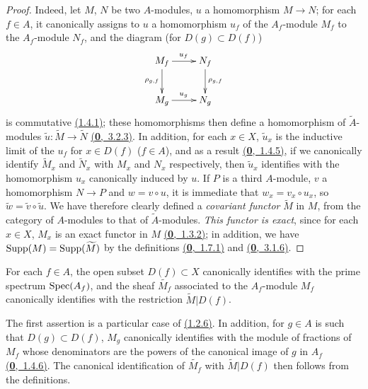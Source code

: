 \begin{proof}
\label{proof-prop-1.1.3.5}
Indeed, let $M$, $N$ be two $A$-modules, $u$ a homomorphism $M\to N$; for each $f\in A$,
it canonically assigns to $u$ a homomorphism $u_f$ of the $A_f$-module $M_f$ to the
$A_f$-module $N_f$, and the diagram (for $D(g)\subset D(f)$)
\[
  \xymatrix{
    M_f\ar[r]^{u_f}\ar[d]_{\rho_{g,f}} & N_f\ar[d]^{\rho_{g,f}}\\
    M_g\ar[r]^{u_g} & N_g
  }
\]
is commutative \hyperref[thm-1.1.4.1]{(1.4.1)}; these homomorphisms then define a homomorphism of
$\widetilde{A}$-modules $\widetilde{u}:\widetilde{M}\to\widetilde{N}$ \hyperref[env-0.3.2.3]{(\textbf{0},~3.2.3)}. In
addition, for each $x\in X$, $\widetilde{u}_x$ is the inductive limit of the $u_f$ for
$x\in D(f)$ ($f\in A$), and as a result \hyperref[env-0.1.4.5]{(\textbf{0},~1.4.5)}, if we canonically identify
$\widetilde{M}_x$ and $\widetilde{N}_x$ with $M_x$ and $N_x$ respectively, then $\widetilde{u}_x$
identifies with the homomorphism $u_x$ canonically induced by $u$. If $P$ is a third
$A$-module, $v$ a homomorphism $N\to P$ and $w=v\circ u$, it is immediate that
$w_x=v_x\circ u_x$, so $\widetilde{w}=\widetilde{v}\circ\widetilde{u}$. We have therefore
clearly defined a {\em covariant functor} $\widetilde{M}$ in $M$, from the category of
$A$-modules to that of $\widetilde{A}$-modules. {\em This functor is exact}, since for each
$x\in X$, $M_x$ is an exact functor in $M$ \hyperref[env-0.1.3.2]{(\textbf{0},~1.3.2)}; in addition, we have
${\mathop{\mathrm{Supp}}\nolimits}(M)={\mathop{\mathrm{Supp}}\nolimits}(\widetilde{M})$ by the definitions \hyperref[env-0.1.7.1]{(\textbf{0},~1.7.1)} and
\hyperref[env-0.3.1.6]{(\textbf{0},~3.1.6)}.
\end{proof}

\begin{prop}[1.3.6]
\label{prop-1.1.3.6}
For each $f\in A$, the open subset $D(f)\subset X$ canonically identifies with the prime
spectrum ${\mathop{\mathrm{Spec}}\nolimits}(A_f)$, and the sheaf $\widetilde{M_f}$ associated to the $A_f$-module
$M_f$ canonically identifies with the restriction $\widetilde{M}|D(f)$.
\end{prop}

The first assertion is a particular case of \hyperref[cor-1.1.2.6]{(1.2.6)}. In addition, for $g\in A$ is
such that $D(g)\subset D(f)$, $M_g$ canonically identifies with the module of fractions of
$M_f$ whose denominators are the powers of the canonical image of $g$ in $A_f$
\hyperref[env-0.1.4.6]{(\textbf{0},~1.4.6)}. The canonical identification of $\widetilde{M_f}$ with
$\widetilde{M}|D(f)$ then follows from the definitions.

